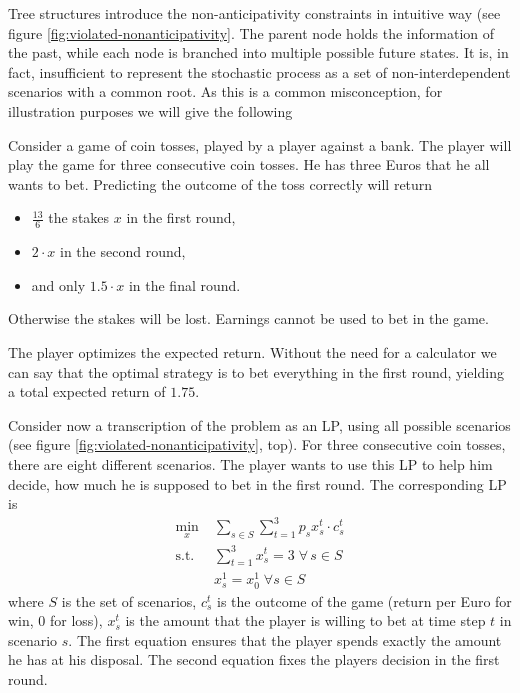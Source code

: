 Tree structures introduce the non-anticipativity constraints in intuitive way (see figure \ref{fig:violated-nonanticipativity}.
The parent node holds the information of the past, while each node is branched into multiple possible future states. 
It is, in fact, insufficient to represent the stochastic process as a set of non-interdependent scenarios with a common root. 
As this is a common misconception, for illustration purposes we will give the following
\begin{example}
  \label{ex:tree-necessity}
  Consider a game of coin tosses, played by a player against a bank. 
  The player will play the game for three consecutive coin tosses. 
  He has three Euros that he all wants to bet. 
  Predicting the outcome of the toss correctly will return 
  \begin{itemize}
  \item $\frac{13}{6}$ the stakes $x$ in the first round,
  \item $2\cdot x$ in the second round,
  \item and only $1.5\cdot x$ in the final round.
  \end{itemize}
  Otherwise the stakes will be lost. 
  Earnings cannot be used to bet in the game.

  The player optimizes the expected return.
  Without the need for a calculator we can say that the optimal strategy is to bet everything in the first round, yielding a total expected return of $1.75$.

  Consider now a transcription of the problem as an LP, using all possible scenarios (see figure \ref{fig:violated-nonanticipativity}, top).
  For three consecutive coin tosses, there are eight different scenarios.
  The player wants to use this LP to help him decide, how much he is supposed to bet in the first round.
  The corresponding LP is
  \begin{align*}
    \min\limits_x &\; \sum_{s\in S}\sum_{t=1}^3p_sx_s^t\cdot c_s^t\\
    \text{s.t.} &\; \sum_{t=1}^3x_s^t = 3 \;\forall\, s\in S\\
    & \; x_s^1 = x_0^1\;\forall s\in S
  \end{align*}
  where $S$ is the set of scenarios, $c_s^t$ is the outcome of the game (return per Euro for win, $0$ for loss), $x_s^t$ is the amount that the player is willing to bet at time step $t$ in scenario $s$. The first equation ensures that the player spends exactly the amount he has at his disposal. The second equation fixes the players decision in the first round.


\end{example}
